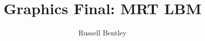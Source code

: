 \documentclass{article}
\title{Graphics Final: MRT LBM}
\author{Russell Bentley}
\begin{document}
\twocolumn

\maketitle

\tableofcontents









\printbibliography
\end{document}
